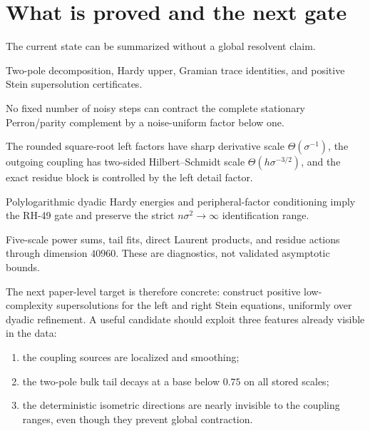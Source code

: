 \documentclass[11pt]{article}
\theoremstyle{definition}
\theoremstyle{remark}
\begin{document}
\section{What is proved and the next gate}
\label{sec:boundary}

The current state can be summarized without a global resolvent claim.

\begin{description}[leftmargin=4.2cm,style=nextline]
 \item[Exact operator algebra]
 Two-pole decomposition, Hardy upper, Gramian trace identities, and
 positive Stein supersolution certificates.

 \item[Exact negative result]
 No fixed number of noisy steps can contract the complete stationary
 Perron/parity complement by a noise-uniform factor below one.

 \item[Small-noise analysis]
 The rounded square-root left factors have sharp derivative scale
 \(\Theta(\sigma^{-1})\), the outgoing coupling has two-sided
 Hilbert--Schmidt scale \(\Theta(h\sigma^{-3/2})\), and the exact residue
 block is controlled by the left detail factor.

 \item[Conditional closure]
 Polylogarithmic dyadic Hardy energies and peripheral-factor conditioning
 imply the RH-49 gate and preserve the strict \(n\sigma^2\to\infty\)
 identification range.

 \item[Floating evidence]
 Five-scale power sums, tail fits, direct Laurent products, and residue
 actions through dimension \(40960\).  These are diagnostics, not validated
 asymptotic bounds.
\end{description}

The next paper-level target is therefore concrete: construct positive
low-complexity supersolutions for the left and right Stein equations,
uniformly over dyadic refinement.  A useful candidate should exploit three
features already visible in the data:

\begin{enumerate}[leftmargin=2.2em]
 \item the coupling sources are localized and smoothing;
 \item the two-pole bulk tail decays at a base below \(0.75\) on all stored
 scales;
 \item the deterministic isometric directions are nearly invisible to the
 coupling ranges, even though they prevent global contraction.
\end{enumerate}
\end{document}
